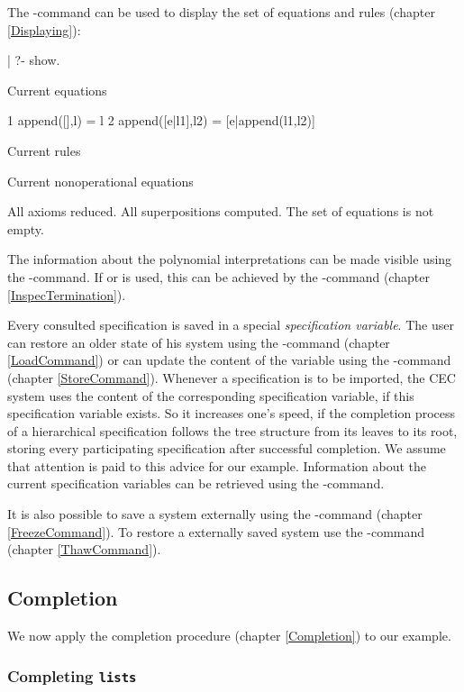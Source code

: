 The -command can be used to display the 
set of equations and rules ( chapter \ref{Displaying}):

\begin{screen}
| ?- show.

Current equations

  1    append([],l) = l
  2    append([e|l1],l2) = [e|append(l1,l2)]

Current rules

Current nonoperational equations

All axioms reduced.
All superpositions computed.
The set of equations is not empty.
\end{screen}

\noindent
The information about the polynomial interpretations can be made
visible using the -command. If 
or  is used, this can be achieved by the
-command ( chapter \ref{InspecTermination}).

Every consulted specification is saved in a special {\em specification
variable}. The user can restore an older state of his system
using the -command ( chapter \ref{LoadCommand})
or can update the content of the variable using the -command
( chapter \ref{StoreCommand}). 
Whenever a specification is to be imported, the CEC system uses the content
of the corresponding specification variable, if this specification variable 
exists. So it increases one's speed, if the completion process of a hierarchical
specification follows the tree structure from its leaves to its root, 
storing every participating specification after successful completion.
We assume that attention is paid to this advice for our example.
Information about the current specification variables
can be retrieved using the -command.

It is also possible to save a system externally using the 
-command ( chapter \ref{FreezeCommand}).
To restore a externally saved system use the -command
( chapter \ref{ThawCommand}).

\subsection{Completion}
We now apply the completion procedure ( chapter
\ref{Completion}) to our example.

\subsubsection{Completing {\tt lists}}

